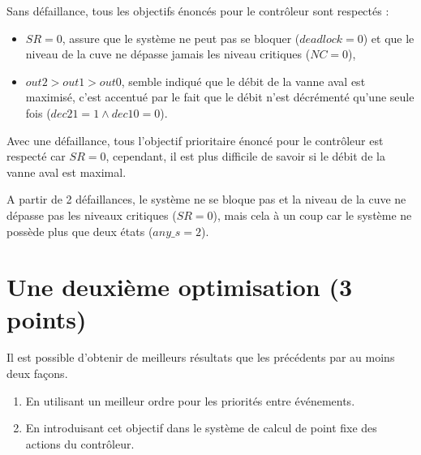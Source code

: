 \documentclass[a4paper]{book}
\begin{document}
Sans défaillance, tous les objectifs énoncés pour le contrôleur sont respectés :
\begin{itemize}
  \item $SR = 0$, assure que le système ne peut pas se bloquer ($deadlock = 0$)
    et que le niveau de la cuve ne dépasse jamais les niveau critiques ($NC =
    0$),
  \item $out2 > out1 > out0$, semble indiqué que le débit de la vanne aval est
    maximisé, c'est accentué par le fait que le débit n'est décrémenté qu'une
    seule fois ($dec21 = 1 \wedge dec10 = 0$).
\end{itemize}


Avec une défaillance, tous l'objectif prioritaire énoncé pour le contrôleur est
respecté car $SR = 0$, cependant, il est plus difficile de savoir si le débit
de la vanne aval est maximal.

A partir de 2 défaillances, le système ne se bloque pas et la niveau de la cuve
ne dépasse pas les niveaux critiques ($SR = 0$), mais cela à un coup car le
système ne possède plus que deux états ($any\_s = 2$).

\section{Une deuxième optimisation (3 points)}

Il est possible d'obtenir de meilleurs résultats que les précédents par au moins deux façons.
\begin{enumerate}
\item En utilisant un meilleur ordre pour les priorités entre événements.
\item En introduisant cet objectif dans le système de calcul de point fixe des actions du contrôleur.
\end{enumerate}
\end{document}
